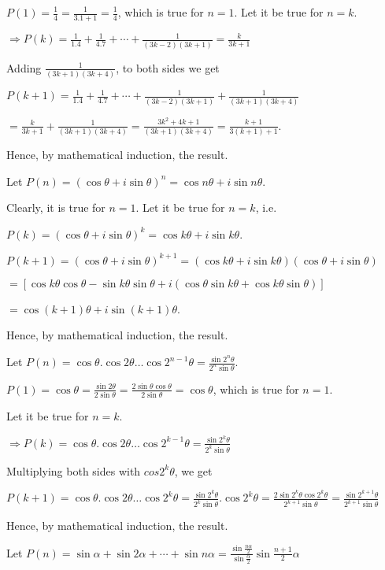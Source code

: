   $P(1) = \frac{1}{4} = \frac{1}{3.1 + 1} = \frac{1}{4}$, which is true for $n = 1$. Let it be true for $n =
  k$.

  $\Rightarrow P(k) = \frac{1}{1.4} + \frac{1}{4.7} + \cdots + \frac{1}{(3k - 2)(3k + 1)} = \frac{k}{3k+ 1}$

  Adding $\frac{1}{(3k + 1)(3k + 4)}$, to both sides we get

  $P(k + 1) = \frac{1}{1.4} + \frac{1}{4.7} + \cdots + \frac{1}{(3k - 2)(3k + 1)} + \frac{1}{(3k + 1)(3k +
    4)}$

  $= \frac{k}{3k+ 1} + \frac{1}{(3k + 1)(3k + 4)} = \frac{3k^2 + 4k + 1}{(3k + 1)(3k + 4)} = \frac{k +
    1}{3(k + 1) + 1}$.

  Hence, by mathematical induction, the result.
\item Let $P(n) = (\cos\theta + i\sin\theta)^n = \cos n\theta + i\sin n\theta$.

  Clearly, it is true for $n = 1$. Let it be true for $n = k$, i.e.

  $P(k) = (\cos\theta + i\sin\theta)^{k} = \cos k\theta + i\sin k\theta$.

  $P(k + 1) = (\cos\theta + i\sin\theta)^{k + 1} = (\cos k\theta + i\sin k\theta)(\cos\theta + i\sin\theta)$

  $= [\cos k\theta\cos\theta - \sin k\theta\sin\theta + i(\cos\theta\sin k\theta + \cos k\theta\sin\theta)]$

  $= \cos(k + 1)\theta + i\sin(k + 1)\theta$.

  Hence, by mathematical induction, the result.
\item Let $P(n) = \cos\theta.\cos2\theta\ldots\cos2^{n - 1}\theta = \frac{\sin2^n\theta}{2^n\sin\theta}$.

  $P(1) = \cos\theta = \frac{\sin2\theta}{2\sin\theta} = \frac{2\sin\theta\cos\theta}{2\sin\theta} =
  \cos\theta$, which is true for $n = 1$.

  Let it be true for $n = k$.

  $\Rightarrow P(k) = \cos\theta.\cos2\theta\ldots\cos2^{k - 1}\theta = \frac{\sin2^k\theta}{2^k\sin\theta}$

  Multiplying both sides with $cos2^k\theta$, we get

  $P(k + 1) = \cos\theta.\cos2\theta\ldots\cos2^k\theta = \frac{\sin2^k\theta}{2^k\sin\theta}.\cos2^k\theta=
  \frac{2\sin2^k\theta\cos2^k\theta}{2^{k + 1}\sin\theta} = \frac{\sin2^{k + 1}\theta}{2^{k + 1}\sin\theta}$

  Hence, by mathematical induction, the result.
\item Let $P(n) = \sin\alpha + \sin2\alpha + \cdots + \sin n\alpha = \frac{\sin
  \frac{n\alpha}{2}}{\sin\frac{\alpha}{2}}\sin\frac{n + 1}{2}\alpha$


